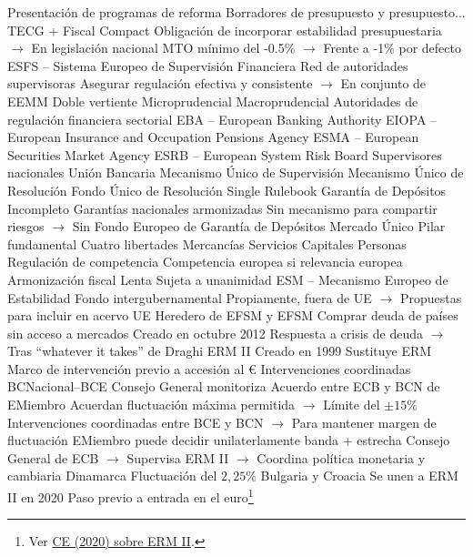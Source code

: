 \documentclass{nuevotema}
\begin{document}
\begin{esquemal}
				\4[] Presentación de programas de reforma
				\4[] Borradores de presupuesto y presupuesto...
				\4 TECG + Fiscal Compact
				\4[] Obligación de incorporar estabilidad presupuestaria
				\4[] $\to$ En legislación nacional
				\4[] MTO mínimo del -0.5\%
				\4[] $\to$ Frente a -1\% por defecto
			\3 ESFS -- Sistema Europeo de Supervisión Financiera
				\4 Red de autoridades supervisoras
				\4[] Asegurar regulación efectiva y consistente
				\4[] $\to$ En conjunto de EEMM
				\4 Doble vertiente
				\4[] Microprudencial
				\4[] Macroprudencial
				\4 Autoridades de regulación financiera sectorial
				\4[] EBA -- European Banking Authority
				\4[] EIOPA -- European Insurance and Occupation Pensions Agency
				\4[] ESMA -- European Securities Market Agency
				\4 ESRB -- European System Risk Board
				\4 Supervisores nacionales
			\3 Unión Bancaria
				\4 Mecanismo Único de Supervisión
				\4 Mecanismo Único de Resolución
				\4 Fondo Único de Resolución
				\4 Single Rulebook
				\4 Garantía de Depósitos
				\4[] Incompleto
				\4[] Garantías nacionales armonizadas
				\4[] Sin mecanismo para compartir riesgos
				\4[] $\to$ Sin Fondo Europeo de Garantía de Depósitos
			\3 Mercado Único
				\4 Pilar fundamental
				\4 Cuatro libertades
				\4[] Mercancías
				\4[] Servicios
				\4[] Capitales
				\4[] Personas
				\4 Regulación de competencia
				\4[] Competencia europea si relevancia europea
				\4 Armonización fiscal
				\4[] Lenta
				\4[] Sujeta a unanimidad
			\3 ESM -- Mecanismo Europeo de Estabilidad
				\4 Fondo intergubernamental
				\4[] Propiamente, fuera de UE
				\4[] $\to$ Propuestas para incluir en acervo UE
				\4 Heredero de EFSM y EFSM
				\4 Comprar deuda de países sin acceso a mercados
				\4 Creado en octubre 2012
				\4[] Respuesta a crisis de deuda
				\4[] $\to$ Tras ``whatever it takes'' de Draghi
			\3 ERM II
				\4 Creado en 1999
				\4 Sustituye ERM
				\4 Marco de intervención previo a accesión al €
				\4[] Intervenciones coordinadas BCNacional--BCE
				\4[] Consejo General monitoriza
				\4 Acuerdo entre ECB y BCN de EMiembro
				\4[] Acuerdan fluctuación máxima permitida
				\4[] $\to$ Límite del $\pm 15\%$
				\4[] Intervenciones coordinadas entre BCE y BCN
				\4[] $\to$ Para mantener margen de fluctuación
				\4[] EMiembro puede decidir unilaterlamente banda + estrecha
				\4[] Consejo General de ECB
				\4[] $\to$ Supervisa ERM II
				\4[] $\to$ Coordina política monetaria y cambiaria
				\4 Dinamarca
				\4[] Fluctuación del $2,25\%$
				\4 Bulgaria y Croacia
				\4[] Se unen a ERM II en 2020
				\4[] Paso previo a entrada en el euro\footnote{Ver \href{https://ec.europa.eu/info/business-economy-euro/euro-area/introducing-euro/adoption-fixed-euro-conversion-rate/erm-ii-eus-exchange-rate-mechanism_en}{CE (2020) sobre ERM II}.}

\end{esquemal}
\end{document}
